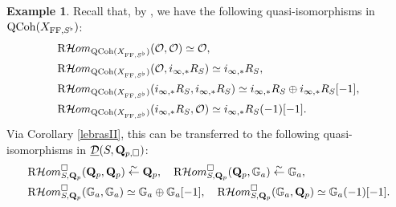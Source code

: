 \documentclass[10pt]{amsart}
\let\cal\mathcal
\theoremstyle{definition}
\newtheorem{example}[equation]{Example}
\theoremstyle{remark}
\newcommand{\Hhom}{{\cal Hom}}
\newcommand{\FF}{\operatorname{FF} }
\newcommand{\so}{{\mathcal O}}
\newcommand{\sd}{{\mathcal{D}}}
\numberwithin{equation}{section}
\def\R{{\mathrm R}}
\def\Q{{\bf Q}} \def\Z{{\bf Z}}
\numberwithin{equation}{section}
\begin{document}
\begin{example} \label{simple1} Recall that, by \cite[Prop. II.2.5]{FS}, we have 
 the following quasi-isomorphisms in ${{\rm QCoh}(X_{\FF,S^{\flat}})}$:
\begin{align*}
&  \R\Hhom_{{\rm QCoh}(X_{\FF,S^{\flat}})} (\so ,\so  )   \simeq \so,\\
& \R\Hhom_{{\rm QCoh}(X_{\FF,S^{\flat}})} (\so  ,i_{\infty,*}R_S )  \simeq i_{\infty,*}R_S,\\
& \R\Hhom_{{\rm QCoh}(X_{\FF,S^{\flat}})} (i_{\infty,*}R_S, i_{\infty,*}R_S )   \simeq i_{\infty,*}R_S \oplus i_{\infty,*}R_S[-1],\\
&  \R\Hhom_{{\rm QCoh}(X_{\FF,S^{\flat}})} (i_{\infty,*}R_S,\so  )  \simeq  i_{\infty,*}R_S(-1)[-1].
\end{align*}
Via Corollary \ref{lebrasII}, this can be transferred to the following quasi-isomorphisms in $\underline{\sd}(S,\Q_{p,\Box})$:
\begin{align*}
& \R\Hhom^{\Box}_{S,\Q_p}(\Q_p,\Q_p)  \stackrel{\sim}{\leftarrow}\Q_p,\quad \R\Hhom^{\Box}_{S,\Q_p}(\Q_p,{\mathbb G}_a)\stackrel{\sim}{\leftarrow}{\mathbb G}_a,\\
&  \R\Hhom^{\Box}_{S,\Q_p}({\mathbb G}_a,{\mathbb G}_a)  \simeq{\mathbb G}_a\oplus{\mathbb G}_a[-1],\quad 
  \R\Hhom^{\Box}_{S,\Q_p}({\mathbb G}_a,\Q_p)  \simeq{\mathbb G}_a(-1)[-1].
\end{align*}
\end{example}
\end{document}
